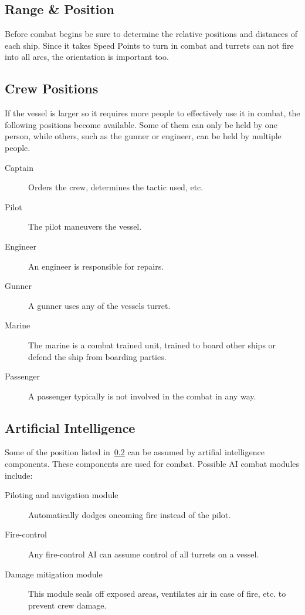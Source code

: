 \subsection{Range \& Position}
\label{sub:Vessels-Combat-Setup-Range}

Before combat begins be sure to determine the relative positions and distances of each ship. Since it takes Speed Points to turn in combat and turrets can not fire into all arcs, the orientation is important too.

\subsection{Crew Positions}
\label{sub:Vessels-Combat-Setup-Crew-Positions}

If the vessel is larger so it requires more people to effectively use it in combat, the following positions become available. Some of them can only be held by one person, while others, such as the gunner or engineer, can be held by multiple people.

\begin{description}
  \item[Captain] Orders the crew, determines the tactic used, etc.
  \item[Pilot] The pilot maneuvers the vessel.
  \item[Engineer] An engineer is responsible for repairs.
  \item[Gunner] A gunner uses any of the vessels turret.
  \item[Marine] The marine is a combat trained unit, trained to board other ships or defend the ship from boarding parties.
  \item[Passenger] A passenger typically is not involved in the combat in any way.
\end{description}

\subsection{Artificial Intelligence}
\label{sub:Vessels-Combat-Setup-Artificial-Intelligence}

Some of the position listed in~\ref{sub:Vessels-Combat-Setup-Crew-Positions} can be assumed by artifial intelligence components. These components are used for combat. Possible AI combat modules include:

\begin{description}
  \item[Piloting and navigation module]
  Automatically dodges oncoming fire instead of the pilot.
  \item[Fire-control]
  Any fire-control AI can assume control of all turrets on a vessel.
  \item[Damage mitigation module] This module seals off exposed areas, ventilates air in case of fire, etc. to prevent crew damage.
\end{description}

